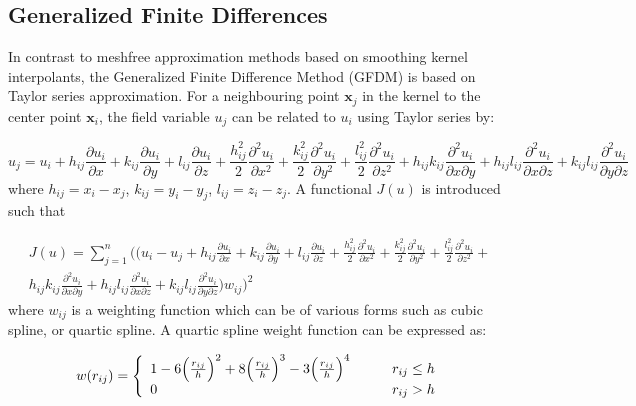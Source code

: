 \documentclass[12pt]{extarticle}
\begin{document}
\subsection{Generalized Finite Differences}
In contrast to meshfree approximation methods based on smoothing kernel interpolants, the Generalized Finite Difference Method (GFDM) is based on Taylor series approximation. For a neighbouring point $\textbf{x}_{j}$ in the kernel to the center point $\textbf{x}_{i}$, the field variable $u_{j}$ can be related to $u_{i}$ using Taylor series by:

\begin{equation}
    u_{j} = u_{i} + h_{ij} \frac{\partial u_{i}}{\partial x} + k_{ij} \frac{\partial u_{i}}{\partial y} + l_{ij} \frac{\partial u_{i}}{\partial z} + \frac{h_{ij}^{2}}{2} \frac{\partial^{2}u_{i}}{\partial x^{2}} + \frac{k_{ij}^{2}}{2} \frac{\partial^{2}u_{i}}{\partial y^{2}} + \frac{l_{ij}^{2}}{2} \frac{\partial^{2}u_{i}}{\partial z^{2}} + h_{ij} k_{ij} \frac{\partial^{2}u_{i}}{\partial x \partial y} + h_{ij} l_{ij} \frac{\partial^{2}u_{i}}{\partial x \partial z} + k_{ij} l_{ij}\frac{\partial^{2}u_{i}}{\partial y \partial z}
\end{equation}
where $h_{ij} = x_{i}-x_{j}$, $k_{ij} = y_{i}-y_{j}$,  $l_{ij} = z_{i}-z_{j}$. A functional $J(u)$ is introduced such that

\begin{align*}
    J(u) = \sum_{j=1}^{n} \bigg( \big(u_{i} - u_{j} + h_{ij} \frac{\partial u_{i}}{\partial x} + k_{ij} \frac{\partial u_{i}}{\partial y} + l_{ij} \frac{\partial u_{i}}{\partial z} + \frac{h_{ij}^{2}}{2} \frac{\partial^{2}u_{i}}{\partial x^{2}} + \frac{k_{ij}^{2}}{2} \frac{\partial^{2}u_{i}}{\partial y^{2}} + \frac{l_{ij}^{2}}{2} \frac{\partial^{2}u_{i}}{\partial z^{2}} + \\ h_{ij} k_{ij} \frac{\partial^{2}u_{i}}{\partial x \partial y} + h_{ij} l_{ij} \frac{\partial^{2}u_{i}}{\partial x \partial z}  + k_{ij} l_{ij}\frac{\partial^{2}u_{i}}{\partial y \partial z} \Big) w_{ij} \Bigg)^{2}
\end{align*}
\begin{equation}
\end{equation}
where $w_{ij}$ is a weighting function which can be of various forms such as cubic spline, or quartic spline. A quartic spline weight function can be expressed as:

\[ w(r_{ij}) = \left\{
  \begin{array}{l l l l l l}
      1 - 6 \Big(\frac{r_{ij}}{h}\Big)^{2} + 8 \Big(\frac{r_{ij}}{h}\Big)^{3} - 3 \Big(\frac{r_{ij}}{h}\Big)^{4} & \quad  & r_{ij} \leq h \\
    0 & \quad  & r_{ij} > h
  \end{array} \right.\]
\begin{equation}
  \label{eq044}
\end{equation}
\end{document}
